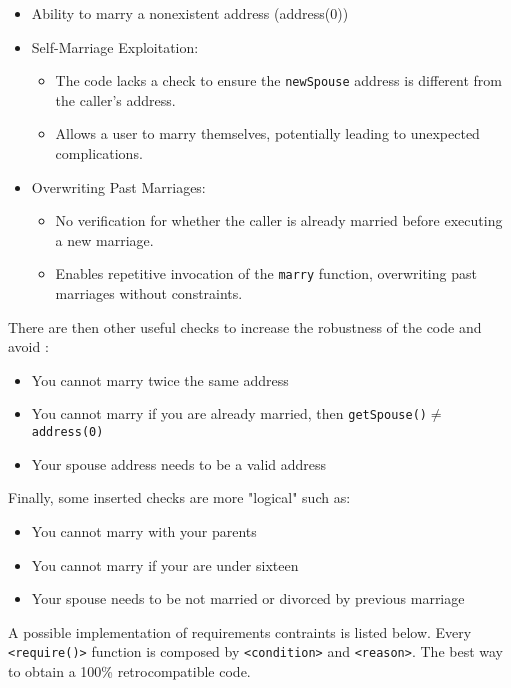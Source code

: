 \documentclass{article}
\begin{document}
 \begin{itemize}
        \small
    \item Ability to marry a nonexistent address (address(0))
    \item Self-Marriage Exploitation:
    \begin{itemize}
            \small
        \item The code lacks a check to ensure the \texttt{newSpouse} address is different from the caller's address.
        \item Allows a user to marry themselves, potentially leading to unexpected complications.
    \end{itemize}

    \item Overwriting Past Marriages:
    \begin{itemize}
            \small
        \item No verification for whether the caller is already married before executing a new marriage.
        \item Enables repetitive invocation of the \texttt{marry} function, overwriting past marriages without constraints.
    \end{itemize}
\end{itemize}
There are then other useful checks to increase the robustness of the code and avoid : 
\begin{itemize}
    \small
\item You cannot marry twice the same address
\item You cannot marry if you are already married, then \texttt{getSpouse()$\neq$address(0)}
\item Your spouse address needs to be a valid address
\end{itemize}
Finally, some inserted checks are more "logical" such as:
\begin{itemize}
    \small
    \item You cannot marry with your parents
    \item You cannot marry if your are under sixteen
    \item Your spouse needs to be not married or divorced by previous marriage
\end{itemize}
A possible implementation of requirements contraints is listed below. Every \texttt{<require()>} function is composed by \texttt{<condition>} and \texttt{<reason>}. The best way to obtain a 100\% retrocompatible code.
\end{document}
